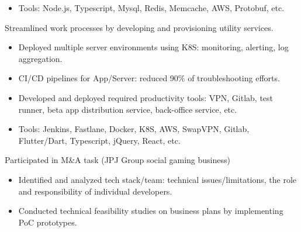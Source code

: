\begin{cventries}
{\begin{cvitems}
\begin{itemize}[leftmargin=2ex]
          \item Tools: Node.js, Typescript, Mysql, Redis, Memcache, AWS, Protobuf, etc.
        \end{itemize}
        \item Streamlined work processes by developing and provisioning utility services.
        \begin{itemize}[leftmargin=2ex]
          \item Deployed multiple server environments using K8S: monitoring, alerting, log aggregation.
          \item CI/CD pipelines for App/Server: reduced 90\% of troubleshooting efforts.
          \item Developed and deployed required productivity tools: VPN, Gitlab, test runner, beta app distribution service, back-office service, etc.
          \item Tools: Jenkins, Fastlane, Docker, K8S, AWS, SwapVPN, Gitlab, Flutter/Dart, Typescript, jQuery, React, etc.
        \end{itemize}
        \item Participated in M\&A task (JPJ Group social gaming business)
        \begin{itemize}[leftmargin=2ex]
          \item Identified and analyzed tech stack/team: technical issues/limitations, the role and responsibility of individual developers.
          \item Conducted technical feasibility studies on business plans by implementing PoC prototypes.
        \end{itemize}
      \end{cvitems}
    }


\end{cventries}
